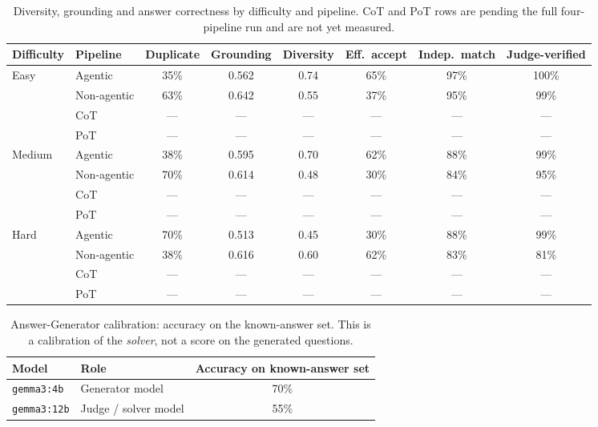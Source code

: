 \begin{table}[H]
\centering
\caption{Diversity, grounding and answer correctness by difficulty and pipeline.
CoT and PoT rows are pending the full four-pipeline run and are not yet measured.}
\label{tab:bulk-answer}
\footnotesize
\setlength{\tabcolsep}{4pt}
\begin{tabular}{|l|l|c|c|c|c|c|c|}
\hline
\textbf{Difficulty} & \textbf{Pipeline} & \textbf{Duplicate} & \textbf{Grounding} &
\textbf{Diversity} & \textbf{Eff.\ accept} & \textbf{Indep.\ match} &
\textbf{Judge-verified} \\
\hline
Easy   & Agentic     & 35\% & 0.562 & 0.74 & 65\% & 97\% & 100\% \\
       & Non-agentic & 63\% & 0.642 & 0.55 & 37\% & 95\% & 99\%  \\
       & CoT         & ---  & ---   & ---  & ---  & ---  & ---   \\
       & PoT         & ---  & ---   & ---  & ---  & ---  & ---   \\
\hline
Medium & Agentic     & 38\% & 0.595 & 0.70 & 62\% & 88\% & 99\% \\
       & Non-agentic & 70\% & 0.614 & 0.48 & 30\% & 84\% & 95\% \\
       & CoT         & ---  & ---   & ---  & ---  & ---  & ---  \\
       & PoT         & ---  & ---   & ---  & ---  & ---  & ---  \\
\hline
Hard   & Agentic     & 70\% & 0.513 & 0.45 & 30\% & 88\% & 99\% \\
       & Non-agentic & 38\% & 0.616 & 0.60 & 62\% & 83\% & 81\% \\
       & CoT         & ---  & ---   & ---  & ---  & ---  & ---  \\
       & PoT         & ---  & ---   & ---  & ---  & ---  & ---  \\
\hline
\end{tabular}
\end{table}

\begin{table}[H]
\centering
\caption{Answer-Generator calibration: accuracy on the known-answer set. This is a
calibration of the \emph{solver}, not a score on the generated questions.}
\label{tab:bulk-gold}
\small
\begin{tabular}{|l|l|c|}
\hline
\textbf{Model} & \textbf{Role} & \textbf{Accuracy on known-answer set} \\
\hline
\texttt{gemma3:4b}  & Generator model      & 70\% \\
\texttt{gemma3:12b} & Judge / solver model & 55\% \\
\hline
\end{tabular}
\end{table}


